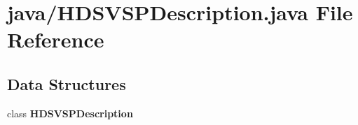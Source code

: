 \section{java/\-H\-D\-S\-V\-S\-P\-Description.java File Reference}
\label{HDSVSPDescription_8java}
\subsection*{Data Structures}
\begin{DoxyCompactItemize}
\item 
class {\bf H\-D\-S\-V\-S\-P\-Description}
\end{DoxyCompactItemize}
